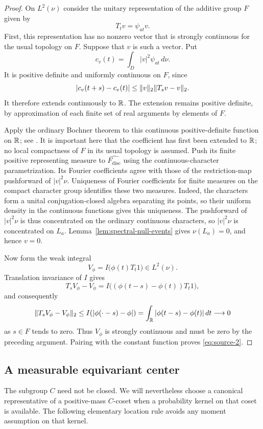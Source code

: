 \begin{proof}
On $L^2(\nu)$ consider the unitary representation of the additive group
$F$ given by
\[
 T_tv=\psi_{at}v.
\]
First, this representation has no nonzero vector that is strongly
continuous for the usual topology on $F$. Suppose that $v$ is such a
vector. Put
\[
 c_v(t)=\int_D|v|^2\psi_{at}\,d\nu.
\]
It is positive definite and uniformly continuous on $F$, since
\[
 |c_v(t+s)-c_v(t)|\le\lVert v\rVert_2\lVert T_sv-v\rVert_2.
\]
It therefore extends continuously to $\mathbb R$. The extension remains
positive definite, by approximation of each finite set of real
arguments by elements of $F$.

Apply the ordinary Bochner theorem to this continuous positive-definite
function on $\mathbb R$; see \citet[Theorem~D.2.2]{Bekka2008}.
It is important here that the coefficient has first been extended to
$\mathbb R$; no local compactness of $F$ in its usual topology is assumed.
Push its finite positive
representing measure to $\widehat{F_{\mathrm{disc}}}$ using the
continuous-character parametrization. Its Fourier coefficients agree
with those of the restriction-map pushforward of $|v|^2\nu$. Uniqueness
of Fourier coefficients for finite measures on the compact character
group identifies these two measures. Indeed, the characters form a
unital conjugation-closed algebra separating its points, so their
uniform density in the continuous functions gives this uniqueness. The pushforward of $|v|^2\nu$ is
thus concentrated on the ordinary continuous characters, so $|v|^2\nu$
is concentrated on $L_a$. Lemma~\ref{lem:spectral-null-events} gives
$\nu(L_a)=0$, and hence $v=0$.

Now form the weak integral
\[
 V_\phi=I\bigl(\phi(t)T_t1\bigr)\in L^2(\nu).
\]
Translation invariance of $I$ gives
\[
 T_sV_\phi-V_\phi
 =I\bigl((\phi(t-s)-\phi(t))T_t1\bigr),
\]
and consequently
\[
 \lVert T_sV_\phi-V_\phi\rVert_2
 \le I(|\phi(\cdot-s)-\phi|)
 =\int_\mathbb R|\phi(t-s)-\phi(t)|\,dt\longrightarrow0
\]
as $s\in F$ tends to zero. Thus $V_\phi$ is strongly continuous and
must be zero by the preceding argument. Pairing with the constant
function proves \eqref{eq:source-2}.
\end{proof}

\subsection{A measurable equivariant center}

The subgroup $C$ need not be closed. We will nevertheless choose a
canonical representative of a positive-mass $C$-coset when a probability
kernel on that coset is available. The following elementary location
rule avoids any moment assumption on that kernel.

